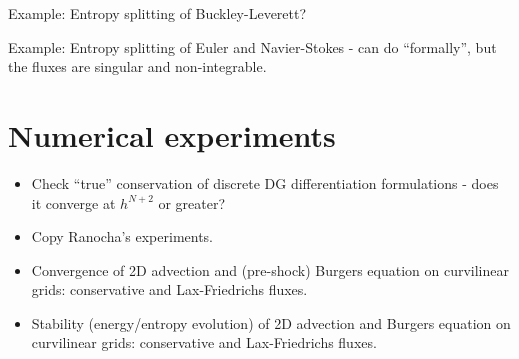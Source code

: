 \documentclass[preprint,10pt]{article}
\theoremstyle{definition}
\theoremstyle{lemma}
\newcommand{\pd}[2]{\frac{\partial#1}{\partial#2}}
\newcommand{\nor}[1]{\left\| #1 \right\|}
\newcommand{\LRp}[1]{\left( #1 \right)}
\newcommand{\LRa}[1]{\left\langle #1 \right\rangle}
\newcommand{\LRc}[1]{\left\{ #1 \right\}}
\newcommand{\jump}[1] {\ensuremath{\llbracket#1\rrbracket}}
\newcommand{\avg}[1] {\ensuremath{\LRc{\!\{#1\}\!}}}
\newcommand*\diff[1]{\mathop{}\!{\mathrm{d}#1}}
\begin{document}
Example: Entropy splitting of Buckley-Leverett?

Example: Entropy splitting of Euler and Navier-Stokes - can do ``formally'', but the fluxes are singular and non-integrable.  

\section{Numerical experiments}

\begin{itemize}
\item Check ``true'' conservation of discrete DG differentiation formulations - does it converge at $h^{N+2}$ or greater?
\item Copy Ranocha's experiments.  
\item Convergence of 2D advection and (pre-shock) Burgers equation on curvilinear grids: conservative and Lax-Friedrichs fluxes.  
\item Stability (energy/entropy evolution) of 2D advection and Burgers equation on curvilinear grids: conservative and Lax-Friedrichs fluxes.  
\end{itemize}

%
%
%
\end{document}
